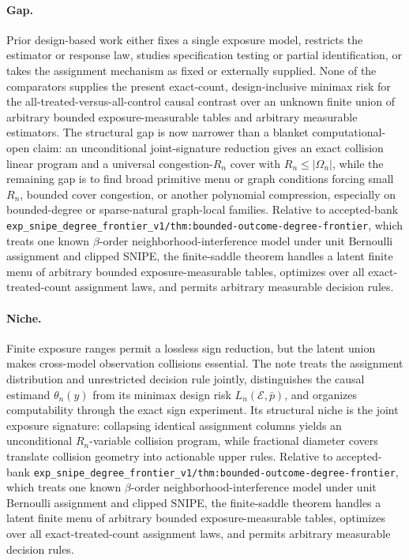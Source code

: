 \documentclass{article}
\begin{document}
\paragraph{Gap.} Prior design-based work either fixes a single exposure model, restricts the estimator or response law, studies specification testing or partial identification, or takes the assignment mechanism as fixed or externally supplied. None of the comparators supplies the present exact-count, design-inclusive minimax risk for the all-treated-versus-all-control causal contrast over an unknown finite union of arbitrary bounded exposure-measurable tables and arbitrary measurable estimators. The structural gap is now narrower than a blanket computational-open claim: an unconditional joint-signature reduction gives an exact collision linear program and a universal congestion-\(R_n\) cover with \(R_n\le|\Omega_n|\), while the remaining gap is to find broad primitive menu or graph conditions forcing small \(R_n\), bounded cover congestion, or another polynomial compression, especially on bounded-degree or sparse-natural graph-local families. Relative to accepted-bank \texttt{exp\_snipe\_degree\_frontier\_v1/thm:bounded-outcome-degree-frontier}, which treats one known \(\beta\)-order neighborhood-interference model under unit Bernoulli assignment and clipped SNIPE, the finite-saddle theorem handles a latent finite menu of arbitrary bounded exposure-measurable tables, optimizes over all exact-treated-count assignment laws, and permits arbitrary measurable decision rules.

\paragraph{Niche.} Finite exposure ranges permit a lossless sign reduction, but the latent union makes cross-model observation collisions essential. The note treats the assignment distribution and unrestricted decision rule jointly, distinguishes the causal estimand \(\theta_n(y)\) from its minimax design risk \(L_n(\mathcal E,\bar p)\), and organizes computability through the exact sign experiment. Its structural niche is the joint exposure signature: collapsing identical assignment columns yields an unconditional \(R_n\)-variable collision program, while fractional diameter covers translate collision geometry into actionable upper rules. Relative to accepted-bank \texttt{exp\_snipe\_degree\_frontier\_v1/thm:bounded-outcome-degree-frontier}, which treats one known \(\beta\)-order neighborhood-interference model under unit Bernoulli assignment and clipped SNIPE, the finite-saddle theorem handles a latent finite menu of arbitrary bounded exposure-measurable tables, optimizes over all exact-treated-count assignment laws, and permits arbitrary measurable decision rules.
\end{document}
